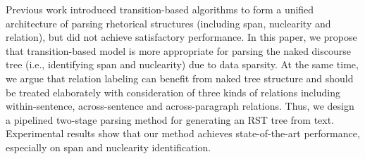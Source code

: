 Previous work introduced transition-based algorithms to form a unified architecture of parsing rhetorical structures (including span, nuclearity and relation), but did not achieve satisfactory performance. In this paper, we propose that transition-based model is more appropriate for parsing the naked discourse tree (i.e., identifying span and nuclearity) due to data sparsity. At the same time, we argue that relation labeling can benefit from naked tree structure and should be treated elaborately with consideration of three kinds of relations including within-sentence, across-sentence and across-paragraph relations. Thus, we design a pipelined two-stage parsing method for generating an RST tree from text. Experimental results show that our method achieves state-of-the-art performance, especially on span and nuclearity identification.
